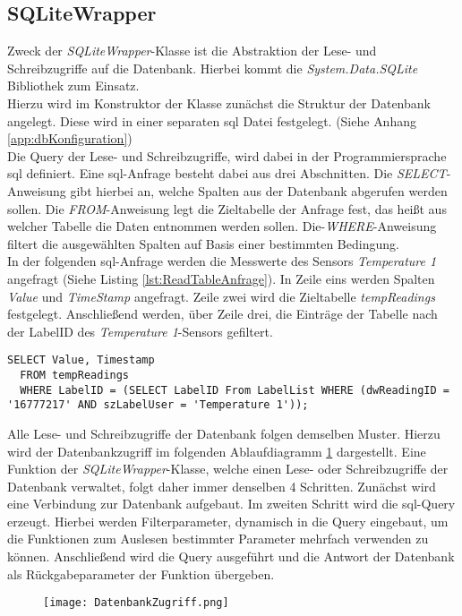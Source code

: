 \subsection*{SQLiteWrapper}
Zweck der \textit{SQLiteWrapper}-Klasse ist die Abstraktion der Lese- und Schreibzugriffe auf die Datenbank.  Hierbei kommt die \textit{System.Data.SQLite} Bibliothek zum Einsatz. \\
Hierzu wird  im Konstruktor der Klasse zunächst die Struktur der Datenbank angelegt. Diese wird in einer separaten \ac{sql} Datei festgelegt. (Siehe Anhang \ref{app:dbKonfiguration})\\
Die Query der Lese- und Schreibzugriffe, wird dabei in der Programmiersprache \ac{sql} definiert. Eine \ac{sql}-Anfrage besteht dabei aus drei Abschnitten. Die \textit{SELECT}-Anweisung gibt hierbei an, welche Spalten aus der Datenbank abgerufen werden sollen. Die \textit{FROM}-Anweisung legt die Zieltabelle der Anfrage fest, das heißt aus welcher Tabelle die Daten entnommen werden sollen. Die-\textit{WHERE}-Anweisung filtert die ausgewählten Spalten auf Basis einer bestimmten Bedingung.\\
In der folgenden \ac{sql}-Anfrage werden die Messwerte des Sensors \textit{Temperature 1} angefragt (Siehe Listing \ref{lst:ReadTableAnfrage}). In Zeile eins werden Spalten \textit{Value} und \textit{TimeStamp} angefragt. Zeile zwei wird die Zieltabelle \textit{tempReadings} festgelegt. Anschließend werden, über Zeile drei, die Einträge der Tabelle nach der LabelID des \textit{Temperature 1}-Sensors gefiltert.  
\begin{lstlisting}[caption={Query Anfrage zum Auslesen eines bestimmten Sensorwertes}, label={lst:ReadTableAnfrage}]
  SELECT Value, Timestamp 
  FROM tempReadings 
  WHERE LabelID = (SELECT LabelID From LabelList WHERE (dwReadingID = '16777217' AND szLabelUser = 'Temperature 1'));
\end{lstlisting}

Alle Lese- und Schreibzugriffe der Datenbank folgen demselben Muster. Hierzu wird der Datenbankzugriff im folgenden Ablaufdiagramm \ref{fig:Datenbankzugriff} dargestellt. Eine Funktion der \textit{SQLiteWrapper}-Klasse, welche einen Lese- oder Schreibzugriffe der Datenbank verwaltet, folgt daher immer denselben 4 Schritten. Zunächst wird eine Verbindung zur Datenbank aufgebaut. Im zweiten Schritt wird die \ac{sql}-Query erzeugt. Hierbei werden Filterparameter, dynamisch in die Query eingebaut, um die Funktionen zum Auslesen bestimmter Parameter mehrfach verwenden zu können. Anschließend wird die Query ausgeführt und die Antwort der Datenbank als Rückgabeparameter der Funktion übergeben.   
\begin{center}
  \begin{figure}[h!]
      \centering
      \texttt{[image: DatenbankZugriff.png]}
      \caption{}
      \label{fig:Datenbankzugriff}
  \end{figure}
\end{center}